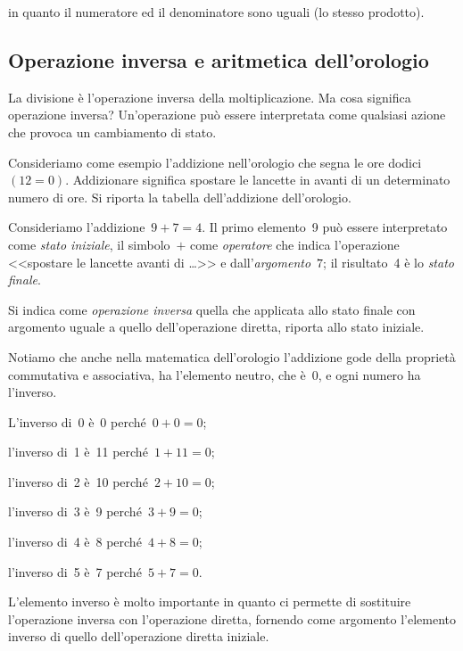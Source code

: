 \noindent in quanto il numeratore ed il denominatore sono uguali (lo stesso prodotto).

\subsection{Operazione inversa e aritmetica dell'orologio}

La divisione è l'operazione inversa della moltiplicazione. Ma cosa significa operazione inversa?
Un'operazione può essere interpretata come qualsiasi azione che provoca un cambiamento di stato.

Consideriamo come esempio l'addizione nell'orologio che segna le ore dodici~$(12=0)$.
Addizionare significa spostare le lancette in avanti di un determinato numero di ore.
Si riporta la tabella dell'addizione dell'orologio.

Consideriamo l'addizione~$9+7=4$.
Il primo elemento~9 può essere interpretato come \emph{stato iniziale}, il simbolo~$+$ come \emph{operatore} che indica l'operazione
<<spostare le lancette avanti di \ldots>> e dall'\emph{argomento}~$7$; il risultato~4 è lo \emph{stato finale}.

Si indica come \emph{operazione inversa} quella che applicata allo stato finale con argomento
uguale a quello dell'operazione diretta, riporta allo stato iniziale.

Notiamo che anche nella matematica dell'orologio l'addizione gode della proprietà commutativa
e associativa, ha l'elemento neutro, che è~0, e ogni numero ha l'inverso.
\begin{center}
 
\end{center}

\begin{multicols}{2}
\begin{itemize*}
\item L'inverso di~0 è~0 perché~$0+0=0$;
\item l'inverso di~1 è~11 perché~$1+11=0$;
\item l'inverso di~2 è~10 perché~$2+10=0$;
\item l'inverso di~3 è~9 perché~$3+9=0$;
\item l'inverso di~4 è~8 perché~$4+8=0$;
\item l'inverso di~5 è~7 perché~$5+7=0$.
\end{itemize*}
\end{multicols}

L'elemento inverso è molto importante in quanto ci permette di sostituire l'operazione inversa
con l'operazione diretta, fornendo come argomento l'elemento inverso di quello dell'operazione diretta iniziale.
\begin{center}
 
\end{center}

